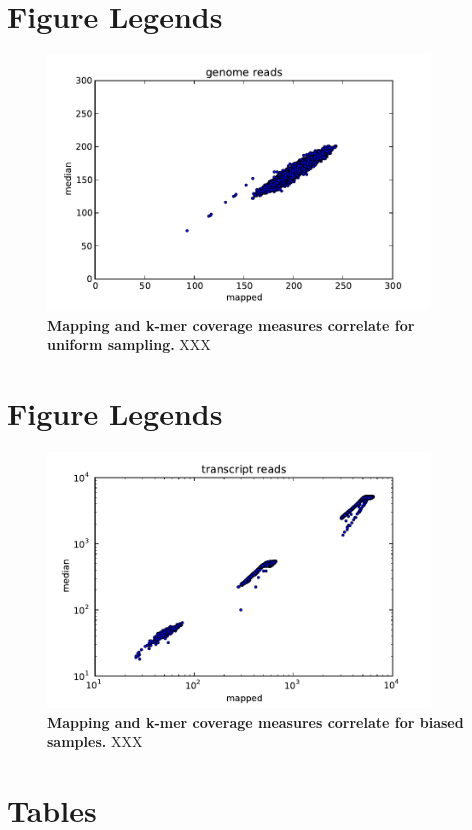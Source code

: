 \documentclass[10pt,draft]{article}
\begin{document}
\section*{Figure Legends}
\begin{figure}[!ht]
\begin{center}
\includegraphics[width=4in]{diginorm-fig1a.pdf}
\end{center}
\caption{
{\bf Mapping and k-mer coverage measures correlate for uniform sampling.}
XXX
}
\label{fig:random}
\end{figure}

\section*{Figure Legends}
\begin{figure}[!ht]
\begin{center}
\includegraphics[width=4in]{diginorm-fig2a.pdf}
\end{center}
\caption{
{\bf Mapping and k-mer coverage measures correlate for biased samples.}
XXX
}
\label{fig:transcripts}
\end{figure}

\section*{Tables}
\end{document}
